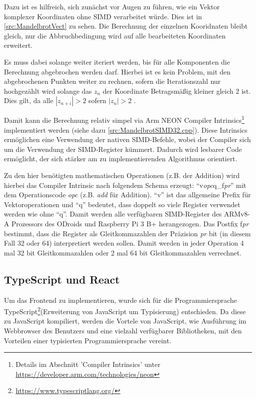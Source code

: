 Dazu ist es hilfreich, sich zunächst vor Augen zu führen, wie ein Vektor komplexer Koordinaten ohne SIMD verarbeitet würde.
Dies ist in \autoref{src:MandelbrotVect} zu sehen.
Die Berechnung der einzelnen Kooridnaten bleibt gleich, nur die Abbruchbedingung wird auf alle bearbeiteten Koordinaten erweitert.

Es muss dabei solange weiter iteriert werden, bis für alle Komponenten die Berechnung abgebrochen werden darf.
Hierbei ist es kein Problem, mit den abgebrochenen Punkten weiter zu rechnen, sofern die
Iterationszahl nur hochgezählt wird solange das $z_n$ der Koordinate Betragsmäßig kleiner gleich $2$ ist.
Dies gilt, da alle $|z_{n+i}| > 2$ sofern $|z_n| > 2$ \cite{424331}.

\begin{figure}[h!]
	
\end{figure}

Damit kann die Berechnung relativ simpel via Arm NEON Compiler Intrinsics\footnote{Details im Abschnitt 'Compiler Intrinsics' unter \url{https://developer.arm.com/technologies/neon}} implementiert werden (siehe dazu \autoref{src:MandelbrotSIMD32.cpp}).
Diese Intrinsics ermöglichen eine Verwendung der nativen SIMD-Befehle, wobei der Compiler sich um die Verwendung der SIMD-Register kümmert.
Dadurch wird lesbarer Code ermöglicht, der sich stärker am zu implementierenden Algorithmus orientiert.

Zu den hier benötigten mathematischen Operationen (z.B. der Addition) wird hierbei das Compiler Intrinsic nach folgendem Schema erzeugt:
\enquote{v\textit{opc}q\_f\textit{pr}} mit dem Operationscode \textit{opc} (z.B. \textit{add} für Addition).
\enquote{v} ist das allgemeine Prefix für Vektoroperationen und \enquote{q} bedeutet, dass doppelt so viele Register verwendet werden wie ohne \enquote{q}.
Damit werden alle verfügbaren SIMD-Register des ARMv8-A Prozessors des ODroids und Raspberry Pi 3 B+ herangezogen.
Das Postfix f\textit{pr} bestimmt, dass die Register als Gleitkommazahlen der Präzision \textit{pr} bit (in diesem Fall 32 oder 64) interpretiert werden sollen.
Damit werden in jeder Operation 4 mal 32 bit Gleitkommazahlen oder 2 mal 64 bit Gleitkommazahlen verrechnet.

\subsection{TypeScript und React}
Um das Frontend zu implementieren, wurde sich für die Programmiersprache TypeScript\footnote{\url{https://www.typescriptlang.org/}}(Erweiterung von JavaScript um Typisierung) entschieden.
Da diese zu JavaScript kompiliert, werden die Vortele von JavaScript, wie Ausführung im Webbrowser des Benutzers und eine vielzahl verfügbarer Bibliotheken,
mit den Vorteilen einer typisierten Programmiersprache vereint.


